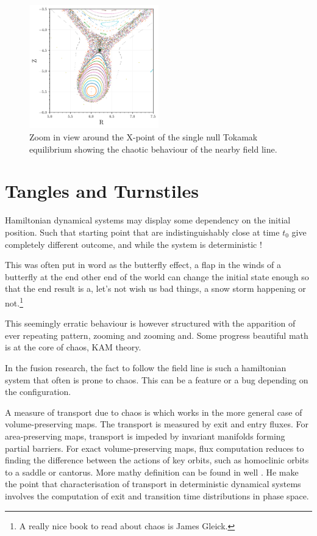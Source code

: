 \begin{figure}
    \centering
    \includegraphics[width=0.5\textwidth]{images/toytok/perturbed-6-1/perturbed_6_1_closer.png}
    \caption{Zoom in view around the X-point of the single null Tokamak equilibrium showing the chaotic behaviour of the nearby field line.}
    \label{fig:xpoint-chaos}
\end{figure}

\chapter{Tangles and Turnstiles}\label{ch:tangleandturns}

Hamiltonian dynamical systems may display some dependency on the initial position. Such that starting point that are indistinguishably close at time $t_0$ give completely different outcome, and while the system is deterministic !

This was often put in word as the butterfly effect, a flap in the winds of a butterfly at the end other end of the world can change the initial state enough so that the end result is a, let's not wish us bad things, a snow storm happening or not.\footnote{A really nice book to read about chaos is James Gleick.}

This seemingly erratic behaviour is however structured with the apparition of ever repeating pattern, zooming and zooming and. Some progress beautiful math is at the core of chaos, KAM theory.

In the fusion research, the fact to follow the field line is such a hamiltonian \cite{escande_description_2024}\cite{abdullaev_magnetic_2014}\cite{viana_hamiltonian_2023} system that often is prone to chaos. This can be a feature or a bug depending on the configuration. 

A measure of transport due to chaos is \cite{meiss_thirty_2015} which works in the more general case of volume-preserving maps. The transport is measured by exit and entry fluxes. For area-preserving maps, transport is impeded by invariant manifolds forming partial barriers. For exact volume-preserving maps, flux computation reduces to finding the difference between the actions of key orbits, such as homoclinic orbits to a saddle or cantorus. More mathy definition can be found in well \cite{hohloch_transport_2012}\cite{hohloch_homoclinic_2017}. He make the point that  characterisation of transport in deterministic dynamical systems involves the computation of exit and transition time distributions in phase space. 


